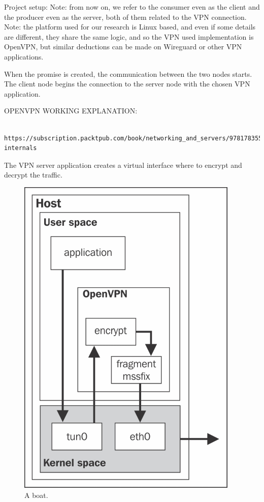 \documentclass[]{article}
\begin{document}
	Project setup: 
	Note: from now on, we refer to the consumer even as the client and the producer even as the server, both of them related to the VPN connection.
    Note: the platform used for our research is Linux based, and even if some details are different, they share the same logic, and so the VPN used implementation is OpenVPN, but similar deductions can be made on Wireguard or other VPN applications.


    When the promise is created, the communication between the two nodes starts. The client node begins the connection to the server node with the chosen VPN application. 

	OPENVPN WORKING EXPLANATION: 
	
	\begin{verbatim}
		https://subscription.packtpub.com/book/networking_and_servers/9781783553136/1/ch01lvl1sec12/openvpn-internals
	\end{verbatim}

	The VPN server application creates a virtual interface where to encrypt and decrypt the traffic.

	\begin{figure}
		\includegraphics[width=\linewidth]{"images/openvpn_tun_interface.jpg"}
		\caption{A boat.}
		\label{fig:boat1}
	\end{figure}
\end{document}
